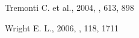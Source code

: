 \begin{thebibliography}{}
 Tremonti C. et al., 2004, \apj, 613, 898








 Wright E. L., 2006, \pasp, 118, 1711








\end{thebibliography}

